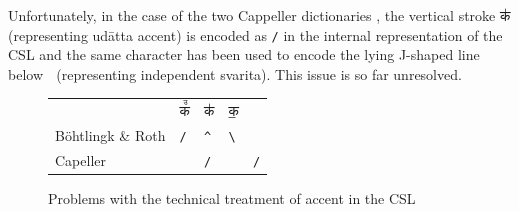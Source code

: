 Unfortunately, in the case of the two Cappeller dictionaries \citep{ccs,cae}, the vertical stroke {\devfont क॑} (representing udātta accent) is encoded as \texttt{{/}} in the internal representation of the CSL and the same character has been used to encode the lying J-shaped line below {\devfont क᳗} (representing independent svarita). This issue is so far unresolved.

\begin{figure}[!ht]
\begin{center}
\begingroup
\setlength{\tabcolsep}{10pt} %
\renewcommand{\arraystretch}{1.5} %
\begin{tabular}{lllll}
 & {\devbfont क꣫} & {\devbfont क॑} & {\devbfont क॒} & {\devbfont क᳗}\\
Böhtlingk \& Roth&\texttt{{/}}&\texttt{{\textasciicircum}}&\texttt{{\textbackslash}} &\\
Capeller&&\texttt{{/}}&&\texttt{{/}}
\end{tabular}
\endgroup
\end{center}
\caption[Problems with the technical treatment of accent in the CSL]{\label{tab:csl2}Problems with the technical treatment of accent in the CSL}
\end{figure}






